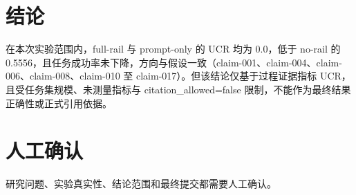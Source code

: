 \documentclass[UTF8]{ctexart}
\begin{document}
\section{结论}
在本次实验范围内，full-\allowbreak{}rail 与 prompt-\allowbreak{}only 的 UCR 均为 0.0，低于 no-\allowbreak{}rail 的 0.5556，且任务成功率未下降，方向与假设一致（claim-\allowbreak{}001、claim-\allowbreak{}004、claim-\allowbreak{}006、claim-\allowbreak{}008、claim-\allowbreak{}010 至 claim-\allowbreak{}017）。但该结论仅基于过程证据指标 UCR，且受任务集规模、未测量指标与 citation\_\allowbreak{}allowed=false 限制，不能作为最终结果正确性或正式引用依据。
\section{人工确认}
研究问题、实验真实性、结论范围和最终提交都需要人工确认。
\end{document}
